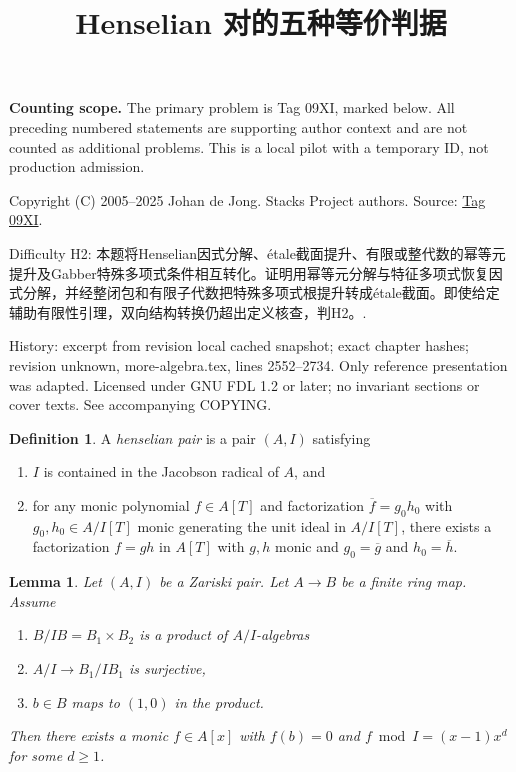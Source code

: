 \documentclass{amsart}
\theoremstyle{plain}
\newtheorem{lemma}[subsection]{Lemma}
\theoremstyle{definition}
\newtheorem{definition}[subsection]{Definition}
\theoremstyle{remark}
\numberwithin{equation}{subsection}
\begin{document}
\title[Stacks Project, Tag 09XI]{Henselian 对的五种等价判据}
\maketitle
\noindent\textbf{Counting scope.} The primary problem is Tag 09XI, marked below. All preceding numbered statements are supporting author context and are not counted as additional problems. This is a local pilot with a temporary ID, not production admission.


\noindent Copyright (C) 2005--2025 Johan de Jong. Stacks Project authors. Source: \href{https://stacks.math.columbia.edu/tag/09XI}{Tag 09XI}.

\noindent Difficulty H2: 本题将Henselian因式分解、étale截面提升、有限或整代数的幂等元提升及Gabber特殊多项式条件相互转化。证明用幂等元分解与特征多项式恢复因式分解，并经整闭包和有限子代数把特殊多项式根提升转成étale截面。即使给定辅助有限性引理，双向结构转换仍超出定义核查，判H2。.

\noindent History: excerpt from revision local cached snapshot; exact chapter hashes; revision unknown, more-algebra.tex, lines 2552--2734. Only reference presentation was adapted. Licensed under GNU FDL 1.2 or later; no invariant sections or cover texts. See accompanying COPYING.

\begin{definition}
\label{definition-henselian-pair}
A {\it henselian pair} is a pair $(A, I)$ satisfying
\begin{enumerate}
\item $I$ is contained in the Jacobson radical of $A$, and
\item for any monic polynomial $f \in A[T]$ and factorization
$\overline{f} = g_0h_0$ with $g_0, h_0 \in A/I[T]$ monic
generating the unit ideal in $A/I[T]$, there
exists a factorization $f = gh$ in $A[T]$ with $g, h$ monic
and $g_0 = \overline{g}$ and $h_0 = \overline{h}$.
\end{enumerate}
\end{definition}

\begin{lemma}
\label{lemma-helper-finite}
Let $(A, I)$ be a Zariski pair. Let $A \to B$ be a finite ring map.
Assume
\begin{enumerate}
\item $B/IB = B_1 \times B_2$ is a product of $A/I$-algebras
\item $A/I \to B_1/IB_1$ is surjective,
\item $b \in B$ maps to $(1, 0)$ in the product.
\end{enumerate}
Then there exists a monic $f \in A[x]$ with $f(b) = 0$ and
$f \bmod I = (x - 1)x^d$ for some $d \geq 1$.
\end{lemma}
\end{document}
